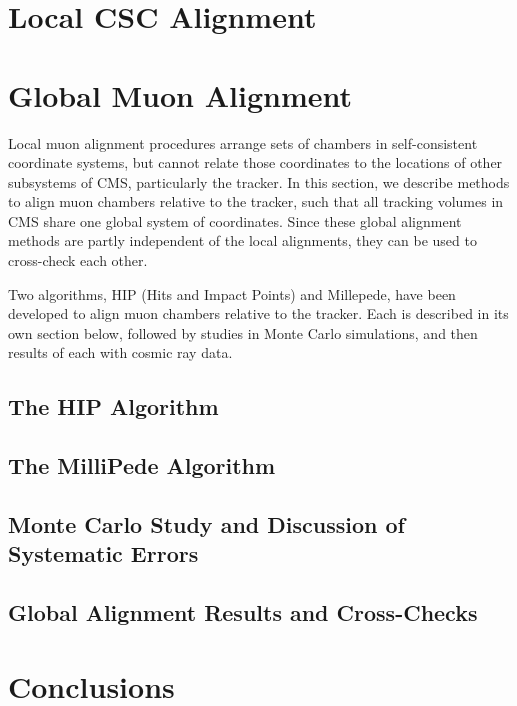 \section{Local CSC Alignment}
\label{sec:localcsc}


\section{Global Muon Alignment}
\label{sec:global_muon_alignment}

Local muon alignment procedures arrange sets of chambers in
self-consistent coordinate systems, but cannot relate those
coordinates to the locations of other subsystems of CMS, particularly
the tracker.  In this section, we describe methods to
align muon chambers relative to the tracker, such that all
tracking volumes in CMS share one global system of coordinates.  Since
these global alignment methods are partly independent of the local alignments,
they can be used to cross-check each other.

Two algorithms, HIP (Hits and Impact Points) and Millepede, have been
developed to align muon chambers relative to the tracker.  Each is
described in its own section below, followed by studies in Monte Carlo
simulations, and then results of each with cosmic ray data.

\subsection{The HIP Algorithm}
\label{sec:hipalgo}
  

\subsection{The MilliPede Algorithm}
  

\subsection{Monte Carlo Study and Discussion of Systematic Errors}


\subsection{Global Alignment Results and Cross-Checks}
  

\section{Conclusions}



